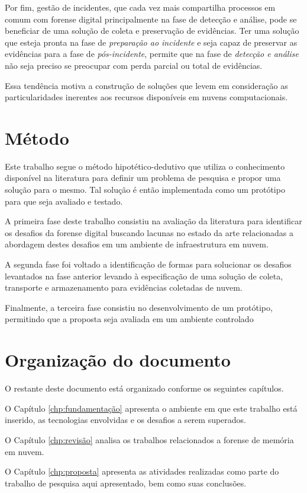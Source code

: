 Por fim, gestão de incidentes, que cada vez mais compartilha processos em comum com forense digital principalmente na fase de detecção e análise, pode se beneficiar de uma solução de coleta e preservação de evidências. Ter uma solução que esteja pronta na fase de \textit{preparação ao incidente} e seja capaz de preservar as evidências para a fase de \textit{pós-incidente}, permite que na fase de \textit{detecção e análise} não seja preciso se preocupar com perda parcial ou total de evidências.


Essa tendência motiva a construção de soluções que levem em consideração as particularidades inerentes aos recursos disponíveis em nuvens computacionais.


\section{Método}
\label{sec:intro-metodo}

Este trabalho segue o método hipotético-dedutivo que utiliza o conhecimento disponível na literatura para definir um problema de pesquisa e propor uma solução para o mesmo. 
%
Tal solução é então implementada como um protótipo para que seja avaliado e testado.
%

A primeira fase deste trabalho consistiu na avaliação da literatura para identificar os desafios da forense digital buscando lacunas no estado da arte relacionadas a abordagem destes desafios em um ambiente de infraestrutura em nuvem.
%

A segunda fase foi voltado a identificação de formas para solucionar os desafios levantados na fase anterior levando à especificação de uma solução de coleta, transporte e armazenamento para evidências coletadas de nuvem.
%

Finalmente, a terceira fase consistiu no desenvolvimento de um protótipo, permitindo que a proposta seja avaliada em um ambiente controlado
%


\section{Organização do documento}
\label{sec:intro-organizacao}

O restante deste documento está organizado conforme os seguintes capítulos.

O Capítulo \ref{chp:fundamentação} apresenta o ambiente em que este trabalho está inserido, as tecnologias envolvidas e os desafios a serem superados. 

O Capítulo \ref{chp:revisão} analisa os trabalhos relacionados a forense de memória em nuvem. 

O Capítulo \ref{chp:proposta} apresenta as atividades realizadas como parte do trabalho de pesquisa aqui apresentado, bem como suas conclusões.